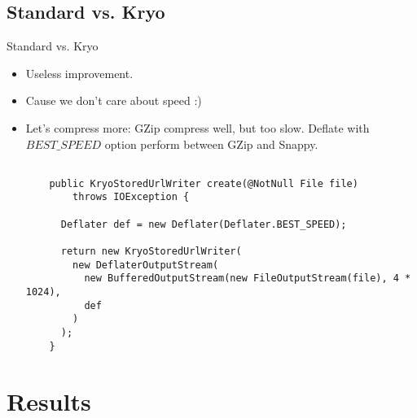 \documentclass[8pt]{beamer}
\begin{document}
\renewcommand{\partname}{Standard vs. Kryo}
\subsection{\partname}
\begin{frame}[fragile]{\partname}
  \begin{itemize}
    \item<1-> \large{Useless improvement.}
    \item<2-> \large{Cause we don't care about speed :)}
    \item<3-> \large{Let's compress more:}
\newline
GZip compress well, but too slow.
Deflate with $BEST\_SPEED$ option perform between GZip and Snappy.

  \begin{verbatim}

    public KryoStoredUrlWriter create(@NotNull File file)
        throws IOException {

      Deflater def = new Deflater(Deflater.BEST_SPEED);

      return new KryoStoredUrlWriter(
        new DeflaterOutputStream(
          new BufferedOutputStream(new FileOutputStream(file), 4 * 1024),
          def
        )
      );
    }
  \end{verbatim}
  \end{itemize}

\end{frame}

\section{Results}
\renewcommand{\partname}{Standard vs. Kryo in queue}
\end{document}

